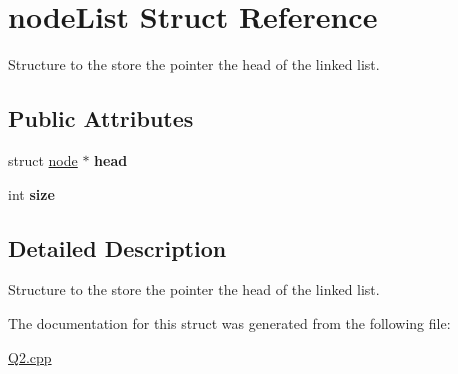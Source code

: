 \hypertarget{structnodeList}{}\section{node\+List Struct Reference}
\label{structnodeList}


Structure to the store the pointer the head of the linked list.  


\subsection*{Public Attributes}
\begin{DoxyCompactItemize}
\item 
\mbox{\label{structnodeList_a98bb9894983e3fccb74f631839187830}} 
struct \hyperlink{structnode}{node} $\ast$ {\bfseries head}
\item 
\mbox{\label{structnodeList_af369eb3bb9568181b0b2005011383c9c}} 
int {\bfseries size}
\end{DoxyCompactItemize}


\subsection{Detailed Description}
Structure to the store the pointer the head of the linked list. 

The documentation for this struct was generated from the following file\+:\begin{DoxyCompactItemize}
\item 
\hyperlink{Q2_8cpp}{Q2.\+cpp}\end{DoxyCompactItemize}
